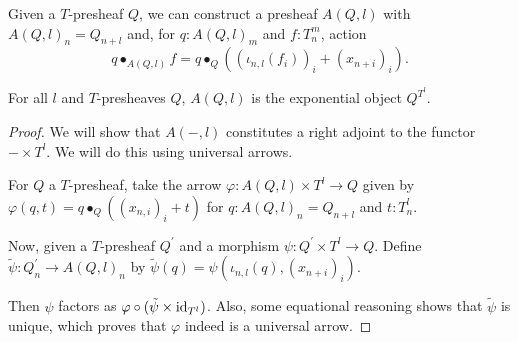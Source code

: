\begin{example}
  Given a $ T $-presheaf $ Q $, we can construct a presheaf $ A(Q, l) $ with $ A(Q, l)_n = Q_{n + l} $ and, for $ q: A(Q, l)_m $ and $ f: T_n^m $, action
  \[ q \bullet_{A(Q, l)} f = q \bullet_Q ((\iota_{n, l} (f_i))_i + (x_{n + i})_i). \]
\end{example}

\begin{lemma}
  For all $ l $ and $ T $-presheaves $ Q $, $ A(Q, l) $ is the exponential object $ Q^{T^l} $.
\end{lemma}
\begin{proof}
  We will show that $ A(-, l) $ constitutes a right adjoint to the functor $ - \times T^l $. We will do this using universal arrows.

  For $ Q $ a $ T $-presheaf, take the arrow $ \varphi: A(Q, l) \times T^l \to Q $ given by $ \varphi(q, t) = q \bullet_Q ((x_{n, i})_i + t) $ for $ q: A(Q, l)_n = Q_{n + l} $ and $ t: T^l_n $.

  Now, given a $ T $-presheaf $ Q^\prime $ and a morphism $ \psi: Q^\prime \times T^l \to Q $. Define $ \tilde \psi: Q^\prime_n \to A(Q, l)_n $ by $ \tilde \psi(q) = \psi(\iota_{n, l}(q), (x_{n + i})_i) $.

  Then $ \psi $ factors as $ \varphi \circ (\tilde \psi \times \text{id}_{T^l}) $. Also, some equational reasoning shows that $ \tilde \psi $ is unique, which proves that $ \varphi $ indeed is a universal arrow.
\end{proof}
